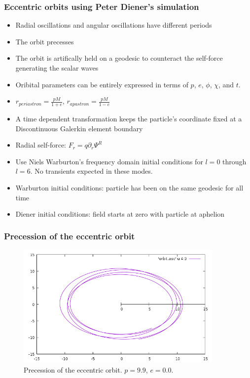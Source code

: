 \documentclass{beamer}
\begin{document}
\begin{frame}
  \frametitle{Eccentric orbits using Peter Diener's simulation}
  \begin{itemize}
  \item Radial oscillations and angular oscillations have different periods
  \item The orbit precesses
  \item The orbit is artifically held on a geodesic to counteract the self-force generating the scalar waves
  \item Oribital parameters can be entirely expressed in terms of $p$, $e$, $\phi$, $\chi$, and $t$.
  \item $r_{periastron}=\frac{pM}{1+e}$, $r_{apastron}=\frac{pM}{1-e}$
  \item A time dependent transformation keeps the particle's coordinate fixed at a Discontinuous Galerkin element boundary
  \item Radial self-force: $F_r=q\partial_r\Psi^R$
  \item Use Niels Warburton's frequency domain initial conditions for $l=0$ through $l=6$. No transients expected in these modes.
  \item Warburton initial conditions: particle has been on the same geodesic for all time
  \item Diener initial conditions: field starts at zero with particle at aphelion
  \end{itemize}
\end{frame}

\begin{frame}
  \frametitle{Precession of the eccentric orbit}
  \begin{figure}
    \includegraphics[width=0.9\textwidth]{orbitevolvedg44p99e01}
    \caption{Precession of the eccentric orbit. $p=9.9$, $e=0.0$.}
  \end{figure}
\end{frame}
\end{document}
